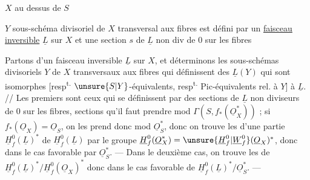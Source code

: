 $X$  au dessus de $S$

$Y$ sous-schéma divisoriel de $X$ transversal aux fibres est défini par un \uline{faisceau inversible} $\underline L$ sur $X$ et une section $s$ de $\underline L$  non div de $0$ sur les fibres

Partons d'un faisceau inversible $\underline L$ sur $X$, et déterminons les  sous-schémas divisoriels $Y$ de $X$ transversaux aux fibres qui définissent des $\underline L(Y)$  qui sont   isomorphes [resp\textsuperscript{t.} $\unsure{S|Y}$-équivalents, resp\textsuperscript{t.}  Pic-équivalents rel. à $Y$] à $\underline L$. // Les premiers sont ceux qui se définissent par des sections de $\underline L$ non diviseurs de $0$ sur les fibres, sections qu'il faut prendre mod $\Gamma(S,f_*(\underline O_X^*))$ ; si $f_*(\underline O_X)=\underline O_S$, on les prend donc mod $\underline O_S^*$, donc on trouve les   d'une  partie $\underline H^0_f(\underline L)^*$ de $\underline H_f^0(\underline L)$ par le groupe $\underline H^0_f(\underline O_X^*)=\unsure{\underline H_f^0|\underline W_f^0}(\underline O_X)^*$, donc dans le cas favorable par $\underline O_S^*$. --- Dans le deuxième cas, on trouve les  de $\underline H^0_f(\underline L)^*/\underline H_f^0(\underline O_X)^*$ donc dans le cas favorable de $\underline H^0_f(\underline L)^*/\underline O_S^*$. ---
